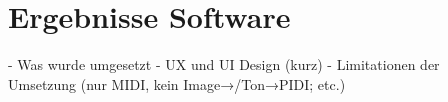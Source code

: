 \chapter{Ergebnisse Software} \label{ergebnisseSW}

\nocite{*}
- Was wurde umgesetzt
- UX und UI Design (kurz)
- Limitationen der Umsetzung (nur MIDI, kein Image→/Ton→PIDI; etc.)